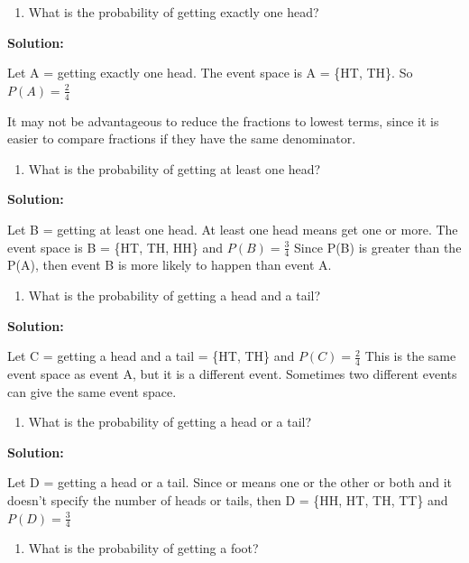 \documentclass[
]{book}
\providecommand{\tightlist}{%
  \setlength{\itemsep}{0pt}\setlength{\parskip}{0pt}}
\begin{document}
\begin{enumerate}
\def\labelenumi{\alph{enumi}.}
\setcounter{enumi}{1}
\tightlist
\item
  What is the probability of getting exactly one head?
\end{enumerate}

\textbf{Solution:}

Let A = getting exactly one head. The event space is A = \{HT, TH\}. So \(P(A)=\frac{2}{4}\)

It may not be advantageous to reduce the fractions to lowest terms, since it is easier to compare fractions if they have the same denominator.

\begin{enumerate}
\def\labelenumi{\alph{enumi}.}
\setcounter{enumi}{2}
\tightlist
\item
  What is the probability of getting at least one head?
\end{enumerate}

\textbf{Solution:}

Let B = getting at least one head. At least one head means get one or more. The event space is B = \{HT, TH, HH\} and \(P(B)=\frac{3}{4}\) Since P(B) is greater than the P(A), then event B is more likely to
happen than event A.

\begin{enumerate}
\def\labelenumi{\alph{enumi}.}
\setcounter{enumi}{3}
\tightlist
\item
  What is the probability of getting a head and a tail?
\end{enumerate}

\textbf{Solution:}

Let C = getting a head and a tail = \{HT, TH\} and \(P(C)=\frac{2}{4}\) This is the same event space as event A, but it is a different event. Sometimes two different events can give the same event space.

\begin{enumerate}
\def\labelenumi{\alph{enumi}.}
\setcounter{enumi}{4}
\tightlist
\item
  What is the probability of getting a head or a tail?
\end{enumerate}

\textbf{Solution:}

Let D = getting a head or a tail. Since or means one or the other or both and it doesn't specify the number of heads or tails, then D = \{HH, HT, TH, TT\} and \(P(D)=\frac{3}{4}\)

\begin{enumerate}
\def\labelenumi{\alph{enumi}.}
\setcounter{enumi}{5}
\tightlist
\item
  What is the probability of getting a foot?
\end{enumerate}
\end{document}
